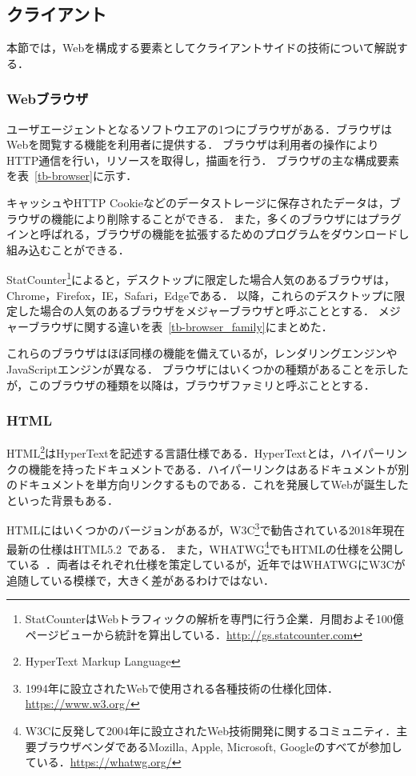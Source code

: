 \subsection{クライアント}
本節では，Webを構成する要素としてクライアントサイドの技術について解説する．
\subsubsection{Webブラウザ}
ユーザエージェントとなるソフトウエアの1つにブラウザがある．ブラウザはWebを閲覧する機能を利用者に提供する．
ブラウザは利用者の操作によりHTTP通信を行い，リソースを取得し，描画を行う．
ブラウザの主な構成要素を表~\ref{tb-browser}に示す．

キャッシュやHTTP Cookieなどのデータストレージに保存されたデータは，ブラウザの機能により削除することができる．
また，多くのブラウザにはプラグインと呼ばれる，ブラウザの機能を拡張するためのプログラムをダウンロードし組み込むことができる．

StatCounter\footnote{StatCounterはWebトラフィックの解析を専門に行う企業．月間およそ100億ページビューから統計を算出している．\url{http://gs.statcounter.com}}によると，デスクトップに限定した場合人気のあるブラウザは，Chrome，Firefox，IE，Safari，Edgeである．
以降，これらのデスクトップに限定した場合の人気のあるブラウザをメジャーブラウザと呼ぶこととする．
メジャーブラウザに関する違いを表~\ref{tb-browser_family}にまとめた．

これらのブラウザはほぼ同様の機能を備えているが，レンダリングエンジンやJavaScriptエンジンが異なる．
ブラウザにはいくつかの種類があることを示したが，このブラウザの種類を以降は，ブラウザファミリと呼ぶこととする．
\subsubsection{HTML}
HTML\footnote{HyperText Markup Language}はHyperTextを記述する言語仕様である．HyperTextとは，ハイパーリンクの機能を持ったドキュメントである．ハイパーリンクはあるドキュメントが別のドキュメントを単方向リンクするものである．これを発展してWebが誕生したといった背景もある．

HTMLにはいくつかのバージョンがあるが，W3C\footnote{1994年に設立されたWebで使用される各種技術の仕様化団体．\url{https://www.w3.org/}}で勧告されている2018年現在最新の仕様はHTML5.2~\cite{html5_2}である．
また，WHATWG\footnote{W3Cに反発して2004年に設立されたWeb技術開発に関するコミュニティ．主要ブラウザベンダであるMozilla, Apple, Microsoft, Googleのすべてが参加している．\url{https://whatwg.org/}}でもHTMLの仕様を公開している~\cite{html_ls}．両者はそれぞれ仕様を策定しているが，近年ではWHATWGにW3Cが追随している模様で，大きく差があるわけではない．
